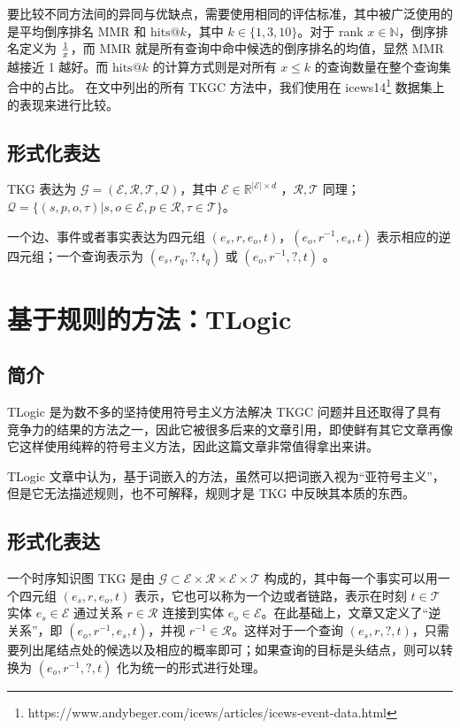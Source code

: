 \documentclass[a4paper, AutoFakeBold]{article}
\begin{document}
要比较不同方法间的异同与优缺点，需要使用相同的评估标准，其中被广泛使用的是平均倒序排名 MMR 和 $\text{hits}@k$，其中 $k\in\{1,3,10\}$。对于 rank $x\in{\mathbb N}$，倒序排名定义为 $1\over x$，而 MMR 就是所有查询中命中候选的倒序排名的均值，显然 MMR 越接近 1 越好。而 $\text{hits}@k$ 的计算方式则是对所有 $x\le k$ 的查询数量在整个查询集合中的占比。 在文中列出的所有 TKGC 方法中，我们使用在 icews14\footnote{https://www.andybeger.com/icews/articles/icews-event-data.html} 数据集上的表现来进行比较。

\subsection{形式化表达}

TKG 表达为 ${\mathcal G}=({\mathcal E},{\mathcal R},{\mathcal T},{\mathcal Q})$，其中 ${\mathcal E}\in{\mathbb R}^{|{\mathcal E}|\times d}$ ，${\mathcal R},{\mathcal T}$ 同理；${\mathcal Q}=\{(s,p,o,\tau)|s,o\in{\mathcal E},p\in{\mathcal R},\tau\in{\mathcal T}\}$。

一个边、事件或者事实表达为四元组 $(e_s,r,e_o,t)$，$(e_o,r^{-1},e_s,t)$ 表示相应的逆四元组；一个查询表示为 $(e_s,r_q,?,t_q)$ 或 $(e_o,r^{-1},?,t)$ 。


\section{基于规则的方法：TLogic}


\subsection{简介}

TLogic 是为数不多的坚持使用符号主义方法解决 TKGC 问题并且还取得了具有竞争力的结果的方法之一，因此它被很多后来的文章引用，即使鲜有其它文章再像它这样使用纯粹的符号主义方法，因此这篇文章非常值得拿出来讲。

TLogic 文章中认为，基于词嵌入的方法，虽然可以把词嵌入视为“亚符号主义”，但是它无法描述规则，也不可解释，规则才是 TKG 中反映其本质的东西。

\subsection{形式化表达}

一个时序知识图 TKG 是由 ${\mathcal G}\subset{\mathcal E}\times{\mathcal R}\times{\mathcal E}\times{\mathcal T}$ 构成的，其中每一个事实可以用一个四元组 $(e_s,r,e_o,t)$ 表示，它也可以称为一个边或者链路，表示在时刻 $t\in{\mathcal T}$ 实体 $e_s\in{\mathcal E}$ 通过关系 $r\in{\mathcal R}$ 连接到实体 $e_o\in{\mathcal E}$。在此基础上，文章又定义了“逆关系”，即 $(e_o,r^{-1},e_s,t)$，并视 $r^{-1}\in{\mathcal R}$。这样对于一个查询 $(e_s,r,?,t)$，只需要列出尾结点处的候选以及相应的概率即可；如果查询的目标是头结点，则可以转换为 $(e_o,r^{-1},?,t)$ 化为统一的形式进行处理。
\end{document}
